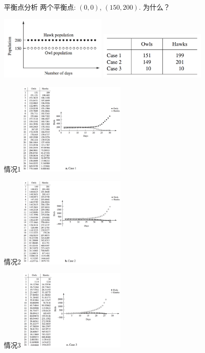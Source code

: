 \documentclass[
  ignorenonframetext,
]{ctexbeamer}
\begin{document}
\begin{frame}{平衡点分析}
\label{ux5e73ux8861ux70b9ux5206ux6790}
两个平衡点: \((0, 0)\), \((150, 200)\). 为什么？

\includegraphics[width=0.4\textwidth,height=\textheight]{owl.png}
\includegraphics[width=0.4\textwidth,height=\textheight]{owl-start.png}
\end{frame}

\begin{frame}{情况1}
\label{ux60c5ux51b51}
\includegraphics[width=0.4\textwidth,height=\textheight]{owl-1.png}
\end{frame}

\begin{frame}{情况2}
\label{ux60c5ux51b52}
\includegraphics[width=0.4\textwidth,height=\textheight]{owl-2.png}
\end{frame}

\begin{frame}{情况3}
\label{ux60c5ux51b53}
\includegraphics[width=0.4\textwidth,height=\textheight]{owl-3.png}
\end{frame}
\end{document}
